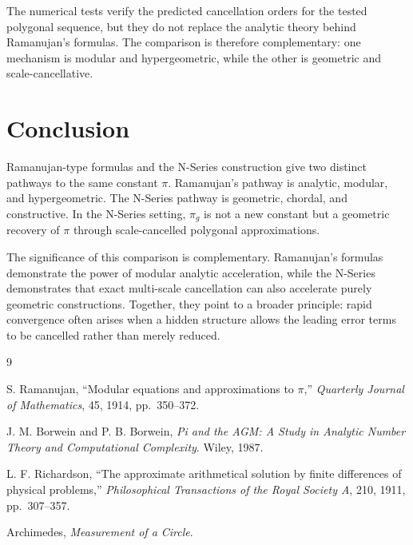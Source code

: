 \documentclass[11pt]{article}
\begin{document}
The numerical tests verify the predicted cancellation orders for the tested
polygonal sequence, but they do not replace the analytic theory behind
Ramanujan's formulas.  The comparison is therefore complementary: one
mechanism is modular and hypergeometric, while the other is geometric and
scale-cancellative.

\section{Conclusion}

Ramanujan-type formulas and the N-Series construction give two distinct
pathways to the same constant $\pi$. Ramanujan's pathway is analytic, modular,
and hypergeometric. The N-Series pathway is geometric, chordal, and
constructive. In the N-Series setting, $\pi_g$ is not a new constant but a
geometric recovery of $\pi$ through scale-cancelled polygonal approximations.

The significance of this comparison is complementary. Ramanujan's formulas
demonstrate the power of modular analytic acceleration, while the N-Series
demonstrates that exact multi-scale cancellation can also accelerate purely
geometric constructions. Together, they point to a broader principle: rapid
convergence often arises when a hidden structure allows the leading error
terms to be cancelled rather than merely reduced.

\begin{thebibliography}{9}

S. Ramanujan,
``Modular equations and approximations to $\pi$,''
\emph{Quarterly Journal of Mathematics}, 45, 1914, pp.\ 350--372.

J. M. Borwein and P. B. Borwein,
\emph{Pi and the AGM: A Study in Analytic Number Theory and Computational
Complexity}.
Wiley, 1987.

L. F. Richardson,
``The approximate arithmetical solution by finite differences of physical
problems,''
\emph{Philosophical Transactions of the Royal Society A}, 210, 1911,
pp.\ 307--357.

Archimedes,
\emph{Measurement of a Circle}.

\end{thebibliography}
\end{document}
